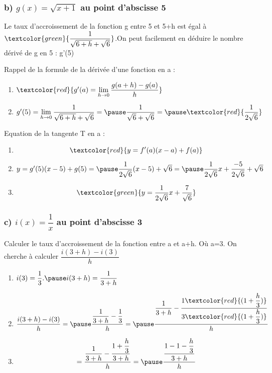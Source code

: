 \documentclass[t]{beamer}
\begin{document}
	\begin{frame}[label=pagebanale]
		\frametitle{b) $g(x) = \sqrt{x+1}$ au point d'abscisse 5}
		\pause
		Le taux d'accroissement de la fonction g entre 5 et 5+h est égal à \pause $\textcolor{green}{\dfrac{1}{\sqrt{6+h} + \sqrt{6}}}$.\pause On peut facilement en déduire le nombre dérivé de g en 5 : g'(5)

		\pause
		Rappel de la formule de la dérivée d'une fonction en a :
		\pause 
		\begin{enumerate}[]
			\item<+-> \(\textcolor{red}{g'(a) = \lim\limits_{h \rightarrow 0}\dfrac{g(a+h)-g(a)}{h}}\)
			\item<+-> \(g'(5) = \lim\limits_{h \rightarrow 0}\dfrac{1}{\sqrt{6+h} + \sqrt{6}} = \pause \dfrac{1}{\sqrt{6} + \sqrt{6}} = \pause \textcolor{red}{\dfrac{1}{2\sqrt{6}}}\)
			\pause
		\end{enumerate}

		Equation de la tangente T en a :
		\pause
		\begin{enumerate}[]
			\item<+-> \[\textcolor{red}{y = f'(a)(x-a) + f(a)}\]
			\item<+-> \(y=g'(5)(x-5) + g(5) = \pause \dfrac{1}{2 \sqrt{6}}(x-5) + \sqrt{6}  = \pause \dfrac{1}{2 \sqrt{6}}x + \dfrac{-5}{2 \sqrt{6}} + \sqrt{6} \)
			\pause
			\item<+-> \[\textcolor{green}{y = \dfrac{1}{2\sqrt{6}}x + \dfrac{7}{\sqrt{6}}}\]
		\end{enumerate}
	\end{frame}

	\begin{frame}
		\frametitle{c) $i(x) = \dfrac{1}{x}$ au point d'abscisse 3}
		\pause
		Calculer le taux d'accroissement de la fonction entre a et a+h. \pause Où a=3.
		\pause
		On cherche à calculer \( \dfrac{i(3+h) - i(3)}{h} \)
		\pause
		\begin{enumerate}[]
			\item<+-> \(i(3) = \dfrac{1}{3}. \pause i(3+h) = \dfrac{1}{3+h}\) 
			\pause
			\item<+-> \[\dfrac{i(3+h) - i(3)}{h} = \pause \dfrac{\dfrac{1}{3+h} - \dfrac{1}{3} }{h} = \pause \dfrac{\dfrac{1}{3+h}-\dfrac{1\textcolor{red}{(1+\dfrac{h}{3})}}{3\textcolor{red}{(1+\dfrac{h}{3})}}}{h}\]
			\pause
			\item<+-> \[ = \dfrac{\dfrac{1}{3+h}-\dfrac{1+\dfrac{h}{3}}{3+h}}{h} = \pause \dfrac{\dfrac{1-1-\dfrac{h}{3}}{3+h}}{h} \]
		\end{enumerate}
	\end{frame}
\end{document}
